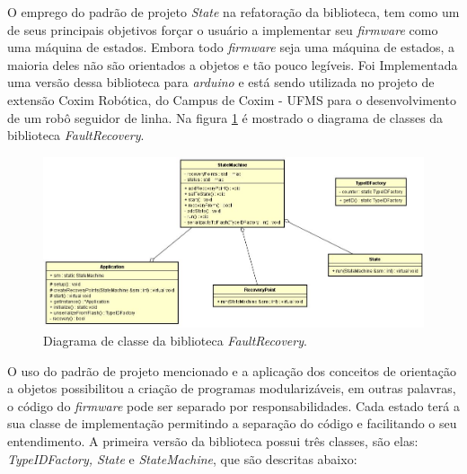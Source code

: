 O emprego do padrão de projeto \textit{State} na refatoração da biblioteca, tem como um de seus principais objetivos forçar o usuário a implementar seu \textit{firmware} como uma máquina de estados. Embora todo \textit{firmware} seja uma máquina de estados, a maioria deles não são orientados a objetos e tão pouco legíveis. Foi Implementada uma versão dessa biblioteca para \textit{arduino} e está sendo utilizada no projeto de extensão Coxim Robótica, do Campus de Coxim - UFMS para o desenvolvimento de um robô seguidor de linha. Na figura \ref{Img:diagramaFaultRecovery} é mostrado o diagrama de classes da biblioteca \textit{FaultRecovery}.

\begin{figure}[H]
	\centering
	\includegraphics[width=1.0\textwidth]{figuras/diagramaFaultRecovery.jpg}
	\caption[Diagrama de classes da biblioteca \textit{FaultRecovery}.]{Diagrama de classe da biblioteca \textit{FaultRecovery}.}
	\label{Img:diagramaFaultRecovery}	
\end{figure}

O uso do padrão de projeto mencionado e a aplicação dos conceitos de orientação a objetos possibilitou a criação de programas modularizáveis, em outras palavras, o código do \textit{firmware} pode ser separado por responsabilidades. Cada estado terá a sua classe de implementação permitindo a separação do código e facilitando o seu entendimento. A primeira versão da biblioteca possui três classes, são elas: \textit{TypeIDFactory, State} e \textit{StateMachine}, que são descritas abaixo:

